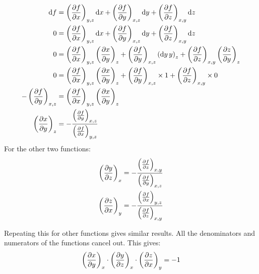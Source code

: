 \documentclass[10pt,\jkfside,a4paper]{article}
\begin{document}
\begin{equation}
\begin{split}
\dd{f} &= \left(\pdv{f}{x}\right)_{y,z}\dd{x} + \left(\pdv{f}{y}\right)_{x,z}\dd{y} + \left(\pdv{f}{z}\right)_{x,y}\dd{z} \\
0 &= \left(\pdv{f}{x}\right)_{y,z}\dd{x} + \left(\pdv{f}{y}\right)_{x,z}\dd{y} + \left(\pdv{f}{z}\right)_{x,y}\dd{z} \\
0 &= \left(\pdv{f}{x}\right)_{y,z}\left(\pdv{x}{y}\right)_z + \left(\pdv{f}{y}\right)_{x,z}\left(\dd{y}{y}\right)_{z} + \left(\pdv{f}{z}\right)_{x,y}\left(\pdv{z}{y}\right)_z \\
0 &= \left(\pdv{f}{x}\right)_{y,z}\left(\pdv{x}{y}\right)_z + \left(\pdv{f}{y}\right)_{x,z} \times 1 + \left(\pdv{f}{z}\right)_{x,y}\times 0 \\
-\left(\pdv{f}{y}\right)_{x,z} &= \left(\pdv{f}{x}\right)_{y,z}\left(\pdv{x}{y}\right)_z \\
\left(\pdv{x}{y}\right)_z &= -\frac{\left(\pdv{f}{y}\right)_{x,z}}{\left(\pdv{f}{x}\right)_{y,z}} \\
\end{split}
\end{equation}
For the other two functions:
\begin{equation}
\begin{split}
\left(\pdv{y}{z}\right)_x &= -\frac{\left(\pdv{f}{z}\right)_{x,y}}{\left(\pdv{f}{y}\right)_{x,z}} \\
\left(\pdv{z}{x}\right)_y &= -\frac{\left(\pdv{f}{x}\right)_{y,z}}{\left(\pdv{f}{z}\right)_{x,y}} \\
\end{split}
\end{equation}

Repeating this for other functions gives similar results. All the denominators and numerators of the functions 
cancel out. This gives:
\begin{equation}
\left(\pdv{x}{y}\right)_x\cdot\left(\pdv{y}{z}\right)_x\cdot\left(\pdv{z}{x}\right)_y = -1 \\
\end{equation}
\end{document}

